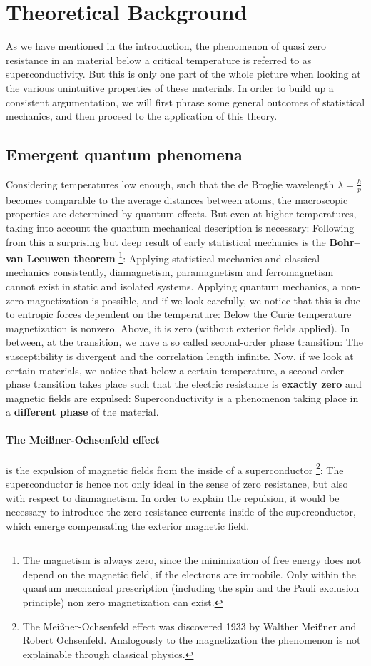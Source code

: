 \section{Theoretical Background}
\label{sec:theory}
As we have mentioned in the introduction, the phenomenon of quasi zero
resistance in an material below a critical temperature is referred to as superconductivity.
But this is only one part of the whole picture when looking at the various
unintuitive properties of these materials. In order to build up a consistent argumentation,
we will first phrase some general outcomes of statistical mechanics, and then proceed to the
application of this theory.
\subsection{Emergent quantum phenomena}
Considering temperatures low enough, such that the de Broglie wavelength $\lambda = \frac{h}{p}$ becomes comparable to the
average distances between atoms, the macroscopic properties are determined by quantum effects.
But even at higher temperatures, taking into account the quantum mechanical description is necessary:
Following from this a surprising but deep result of early statistical mechanics is the \textbf{Bohr–van Leeuwen theorem}
\footnote{The magnetism is always zero, since the minimization of free energy does not depend
on the magnetic field, if the electrons are immobile. Only within the 
quantum mechanical prescription (including the spin and the
Pauli exclusion principle) non zero magnetization can exist.}:
Applying statistical mechanics and classical mechanics consistently, diamagnetism, paramagnetism and ferromagnetism
cannot exist in static and isolated systems. Applying quantum mechanics, a non-zero magnetization 
is possible, and if we look carefully, we notice that this is due to entropic forces
dependent on the temperature: Below the Curie temperature magnetization is nonzero. Above, it is zero
(without exterior fields applied). In between, at the transition, we have a so called second-order phase
transition: The susceptibility is divergent and the correlation length infinite. Now, if we look
at certain materials, we notice that below a certain temperature, a second order phase transition takes
place such that the electric resistance is \textbf{exactly zero} and magnetic fields are expulsed: 
Superconductivity is a phenomenon taking place in a \textbf{different phase} of the material.
\paragraph{The Meißner-Ochsenfeld effect} is the expulsion of magnetic fields from the inside of a superconductor
\footnote{The Meißner-Ochsenfeld effect was discovered 1933 by Walther Meißner and Robert Ochsenfeld. Analogously to the
magnetization the phenomenon is not explainable through classical physics.}:
The superconductor is hence not only ideal in the sense of zero resistance, but also with respect
to diamagnetism. In order to explain the repulsion, it would be necessary to introduce the zero-resistance
currents inside of the superconductor, which emerge compensating the exterior magnetic field.
